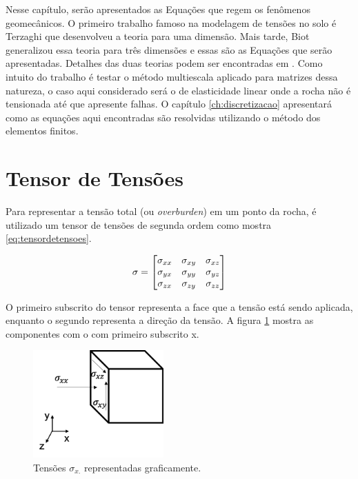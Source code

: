 Nesse capítulo, serão apresentados as Equações que regem os fenômenos geomecânicos. O primeiro trabalho famoso na modelagem de tensões no solo é Terzaghi que desenvolveu a teoria para uma dimensão. Mais tarde, Biot generalizou essa teoria para três dimensões e essas são as Equações que serão apresentadas. Detalhes das duas teorias podem ser encontradas em \citet{CompGeomec}. Como intuito do trabalho é testar o método multiescala aplicado para matrizes dessa natureza, o caso aqui considerado será o de elasticidade linear onde a rocha não é tensionada até que apresente falhas. O capítulo \ref{ch:discretizacao} apresentará como as equações aqui encontradas são resolvidas utilizando o método dos elementos finitos.



\section{Tensor de Tensões}

Para representar a tensão total (ou \textit{overburden}) em um ponto da rocha, é utilizado um tensor de tensões de segunda ordem como mostra \eqref{eq:tensordetensoes}.

\begin{equation} \label{eq:tensordetensoes}
\mathbf{\sigma} =
    \begin{bmatrix}
    \sigma_{xx} & \sigma_{xy} & \sigma_{xz} \\
    \sigma_{yx} & \sigma_{yy} & \sigma_{yz} \\
    \sigma_{zx} & \sigma_{zy} & \sigma_{zz}
    \end{bmatrix}
\end{equation}

O primeiro subscrito do tensor representa a face que a tensão está sendo aplicada, enquanto o segundo representa a direção da tensão. A figura \ref{fig:tensoesx} mostra as componentes com o com primeiro subscrito x.


\begin{figure}[!htbp]
\centering
\includegraphics[width=5cm]{chap01/figs/tensor.png}
\caption{Tensões $\sigma_{x.}$ representadas graficamente.}
\label{fig:tensoesx}
\end{figure}

